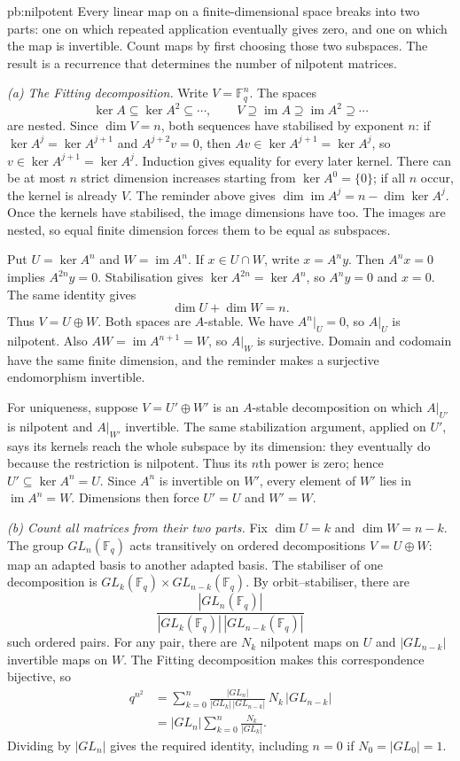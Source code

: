 \begin{solution}{pb:nilpotent}
\idea Every linear map on a finite-dimensional space breaks into two parts: one on which repeated application eventually gives zero, and one on which the map is invertible. Count maps by first choosing those two subspaces. The result is a recurrence that determines the number of nilpotent matrices.

\writeup \emph{(a) The Fitting decomposition.}
Write $V=\mathbb F_q^n$. The spaces
\[
\ker A\subseteq\ker A^2\subseteq\cdots,\qquad
V\supseteq\operatorname{im}A\supseteq\operatorname{im}A^2\supseteq\cdots
\]
are nested. Since $\dim V=n$, both sequences have stabilised by exponent $n$: if $\ker A^j=\ker A^{j+1}$ and $A^{j+2}v=0$, then $Av\in\ker A^{j+1}=\ker A^j$, so $v\in\ker A^{j+1}=\ker A^j$. Induction gives equality for every later kernel. There can be at most $n$ strict dimension increases starting from $\ker A^0=\{0\}$; if all $n$ occur, the kernel is already $V$. The reminder above gives $\dim\operatorname{im}A^j=n-\dim\ker A^j$. Once the kernels have stabilised, the image dimensions have too. The images are nested, so equal finite dimension forces them to be equal as subspaces.

Put $U=\ker A^n$ and $W=\operatorname{im}A^n$. If $x\in U\cap W$, write $x=A^ny$. Then $A^nx=0$ implies $A^{2n}y=0$. Stabilisation gives $\ker A^{2n}=\ker A^n$, so $A^ny=0$ and $x=0$. The same identity gives
\[
\dim U+\dim W=n.
\]
Thus $V=U\oplus W$. Both spaces are $A$-stable. We have $A^n|_U=0$, so $A|_U$ is nilpotent. Also $AW=\operatorname{im}A^{n+1}=W$, so $A|_W$ is surjective. Domain and codomain have the same finite dimension, and the reminder makes a surjective endomorphism invertible.

For uniqueness, suppose $V=U'\oplus W'$ is an $A$-stable decomposition on which $A|_{U'}$ is nilpotent and $A|_{W'}$ invertible. The same stabilization argument, applied on $U'$, says its kernels reach the whole subspace by its dimension: they eventually do because the restriction is nilpotent. Thus its $n$th power is zero; hence $U'\subseteq\ker A^n=U$. Since $A^n$ is invertible on $W'$, every element of $W'$ lies in $\operatorname{im}A^n=W$. Dimensions then force $U'=U$ and $W'=W$.

\emph{(b) Count all matrices from their two parts.}
Fix $\dim U=k$ and $\dim W=n-k$. The group $GL_n(\mathbb F_q)$ acts transitively on ordered decompositions $V=U\oplus W$: map an adapted basis to another adapted basis. The stabiliser of one decomposition is $GL_k(\mathbb F_q)\times GL_{n-k}(\mathbb F_q)$. By orbit--stabiliser, there are
\[
\frac{|GL_n(\mathbb F_q)|}
{|GL_k(\mathbb F_q)|\,|GL_{n-k}(\mathbb F_q)|}
\]
such ordered pairs. For any pair, there are $N_k$ nilpotent maps on $U$ and $|GL_{n-k}|$ invertible maps on $W$. The Fitting decomposition makes this correspondence bijective, so
\[
\begin{aligned}
q^{n^2}
&=\sum_{k=0}^n
\frac{|GL_n|}{|GL_k|\,|GL_{n-k}|}\,
N_k\,|GL_{n-k}|\\
&=|GL_n|\sum_{k=0}^n\frac{N_k}{|GL_k|}.
\end{aligned}
\]
Dividing by $|GL_n|$ gives the required identity, including $n=0$ if $N_0=|GL_0|=1$.


\end{solution}
